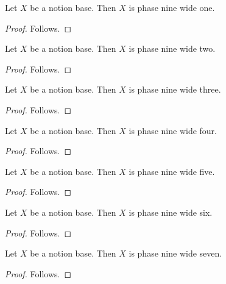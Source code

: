 \begin{classification}\label{notion_base_is_wide_one}
    Let $X$ be a notion base.
    Then $X$ is phase nine wide one.
\end{classification}
\begin{proof}
    Follows.
\end{proof}

\begin{classification}\label{notion_base_is_wide_two}
    Let $X$ be a notion base.
    Then $X$ is phase nine wide two.
\end{classification}
\begin{proof}
    Follows.
\end{proof}

\begin{classification}\label{notion_base_is_wide_three}
    Let $X$ be a notion base.
    Then $X$ is phase nine wide three.
\end{classification}
\begin{proof}
    Follows.
\end{proof}

\begin{classification}\label{notion_base_is_wide_four}
    Let $X$ be a notion base.
    Then $X$ is phase nine wide four.
\end{classification}
\begin{proof}
    Follows.
\end{proof}

\begin{classification}\label{notion_base_is_wide_five}
    Let $X$ be a notion base.
    Then $X$ is phase nine wide five.
\end{classification}
\begin{proof}
    Follows.
\end{proof}

\begin{classification}\label{notion_base_is_wide_six}
    Let $X$ be a notion base.
    Then $X$ is phase nine wide six.
\end{classification}
\begin{proof}
    Follows.
\end{proof}

\begin{classification}\label{notion_base_is_wide_seven}
    Let $X$ be a notion base.
    Then $X$ is phase nine wide seven.
\end{classification}
\begin{proof}
    Follows.
\end{proof}

